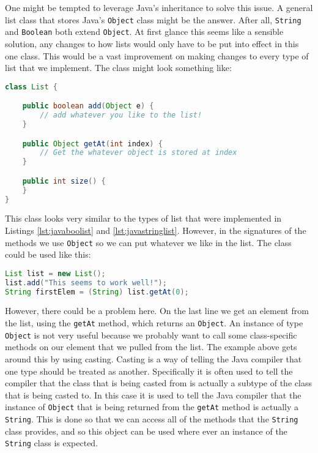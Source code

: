 One might be tempted to leverage Java's inheritance to solve this issue. A
general list class that stores Java's \lstinline{Object} class might be the
answer.  After all, \lstinline{String} and \lstinline{Boolean} both extend
\lstinline{Object}.  At first glance this seems like a sensible solution, any
changes to how lists would only have to be put into effect in this one class.
This would be a vast improvement on making changes to every type of list that
we implement. The class might look something like:

\begin{lstlisting}[caption=A more general approach., language=Java, label={lst:abstractlist}]
class List {

    public boolean add(Object e) {
        // add whatever you like to the list!
    }

    public Object getAt(int index) {
        // Get the whatever object is stored at index
    }

    public int size() {
    }
}
\end{lstlisting}

This class looks very similar to the types of list that were implemented in
Listings \ref{lst:javaboolist} and \ref{lst:javastringlist}. However, in the
signatures of the methods we use \lstinline{Object} so we can put whatever we
like in the list. The class could be used like this:

\begin{lstlisting}[nolol, language=Java, label={lst:usinglist}]
List list = new List();
list.add("This seems to work well!");
String firstElem = (String) list.getAt(0);
\end{lstlisting}

However, there could be a problem here. On the last line we get an element from
the list, using the \lstinline{getAt} method, which returns an
\lstinline{Object}.  An instance of type \lstinline{Object} is not very useful
because we probably want to call some class-specific methods on our element
that we pulled from the list. The example above gets around this by using
casting. Casting is a way of telling the Java compiler that one type should be
treated as another. Specifically it is often used to tell the compiler that the
class that is being casted from is actually a subtype of the class that is
being casted to. In this case it is used to tell the Java compiler that the
instance of \lstinline{Object} that is being returned from the
\lstinline{getAt} method is actually a \lstinline{String}. This is done so that
we can access all of the methods that the \lstinline{String} class provides,
and so this object can be used where ever an instance of the \lstinline{String}
class is expected.

